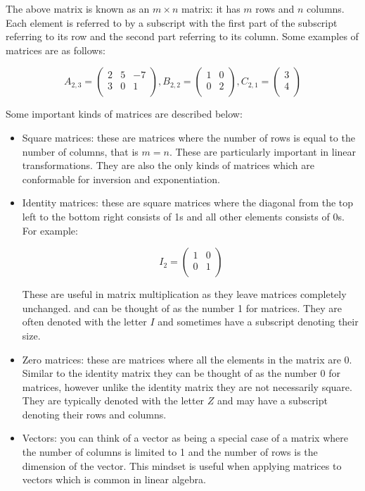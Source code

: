 \documentclass[a4paper,oneside]{report}
\begin{document}
The above matrix is known as an \( m \times n \) matrix: it has \( m \) rows
and \( n \) columns. Each element is referred to by a subscript with the first
part of the subscript referring to its row and the second part referring to
its column. Some examples of matrices are as follows:

\[ A_{2, 3} = \begin{pmatrix}
	2 & 5 & -7 \\
	3 & 0 & 1 \\
\end{pmatrix}, B_{2, 2} = \begin{pmatrix}
	1 & 0 \\
	0 & 2 \\
\end{pmatrix}, C_{2, 1} = \begin{pmatrix}
	3 \\
	4 \\
\end{pmatrix} \]

Some important kinds of matrices are described below:

\begin{itemize}
	\item{Square matrices: these are matrices where the number of rows
		is equal to the number of columns, that is \( m = n \). These
		are particularly important in linear transformations. They
		are also the only kinds of matrices which are conformable for
		inversion and exponentiation.}
	\item{Identity matrices: these are square matrices where the diagonal
		from the top left to the bottom right consists of 1s and all
		other elements consists of 0s. For example:
		
		\[ I_2 = \begin{pmatrix}
			1 & 0 \\
			0 & 1 \\
		\end{pmatrix} \]

		These are useful in matrix multiplication as they leave
		matrices completely unchanged. and can be thought of as the
		number 1 for matrices. They are often denoted with the letter
		\( I \) and sometimes have a subscript denoting their size.}
	\item{Zero matrices: these are matrices where all the elements in the
		matrix are 0. Similar to the identity matrix they can be
		thought of as the number 0 for matrices, however unlike the
		identity matrix they are not necessarily square. They are
		typically denoted with the letter \( Z \) and may have a
		subscript denoting their rows and columns.}
	\item{Vectors: you can think of a vector as being a special case of
		a matrix where the number of columns is limited to 1 and the
		number of rows is the dimension of the vector. This mindset
		is useful when applying matrices to vectors which is common
		in linear algebra.}
\end{itemize}
\end{document}
